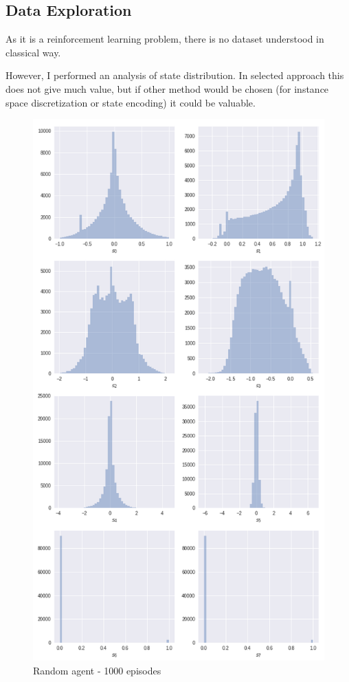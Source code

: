 \documentclass[12pt]{article}
\begin{document}
\subsection{Data Exploration}

As it is a reinforcement learning problem, there is no dataset understood in classical way.

However, I performed an analysis of state distribution. In selected approach this does not give much value, but if other method would be chosen (for instance space discretization or state encoding) it could be valuable.

\begin{figure}[H]
\centering
\includegraphics[scale=0.5]{random.png} 
\caption{Random agent - 1000 episodes}
\end{figure}
\end{document}
